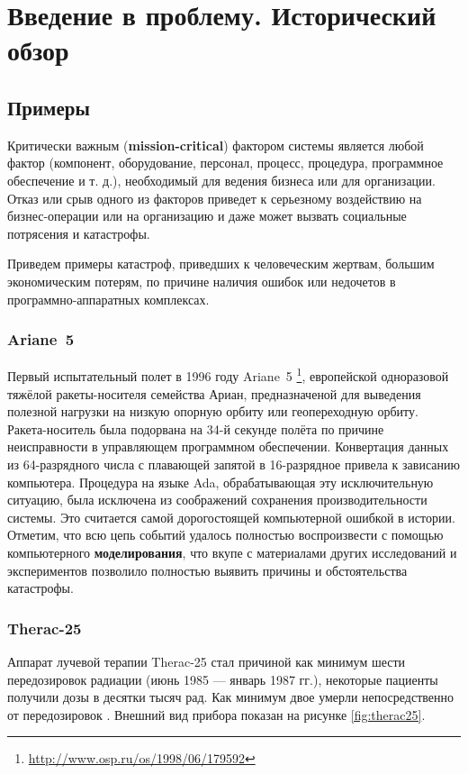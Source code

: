 \chapter{Введение в проблему. Исторический обзор}\label{ch:ch1}

\section{Примеры}
Критически важным (\textbf{mission-critical}) фактором системы является любой фактор
(компонент, оборудование, персонал, процесс, процедура, программное обеспечение и т. д.),
необходимый для ведения бизнеса или для организации.
Отказ или срыв одного из факторов приведет к серьезному воздействию на бизнес-операции или на организацию
и даже может вызвать социальные потрясения и катастрофы.

Приведем примеры катастроф, приведших к человеческим жертвам, большим экономическим потерям,
по причине наличия ошибок или недочетов в программно-аппаратных комплексах.

\subsection{Ariane~5}

    Первый испытательный полет в 1996 году Ariane~5 \cite{journal:open_system:1998_adjaev}\footnote{\url{http://www.osp.ru/os/1998/06/179592}},
    европейской одноразовой тяжёлой ракеты-носителя семейства Ариан,
    предназначеной для выведения полезной нагрузки на низкую опорную орбиту или геопереходную орбиту. 
    Ракета-носитель была подорвана на 34-й секунде полёта по причине неисправности в управляющем программном обеспечении.
    Конвертация данных из 64-разрядного числа с плавающей запятой в 16-разрядное привела к зависанию компьютера.
    Процедура на языке Ada, обрабатывающая эту исключительную ситуацию, была исключена из соображений сохранения производительности системы.
    Это считается самой дорогостоящей компьютерной ошибкой в истории.
    Отметим, что всю цепь событий удалось полностью воспроизвести с помощью компьютерного \textbf{моделирования}, что вкупе с материалами других исследований и экспериментов позволило полностью выявить причины и обстоятельства катастрофы.
\subsection{Therac-25}

    Аппарат лучевой терапии Therac-25 стал причиной как минимум шести передозировок радиации (июнь 1985 --- январь 1987 гг.),
    некоторые пациенты получили дозы в десятки тысяч рад. Как минимум двое умерли непосредственно от передозировок \cite{journal:computer:1993:therac25}.
    Внешний вид прибора показан на рисунке \ref{fig:therac25}.
